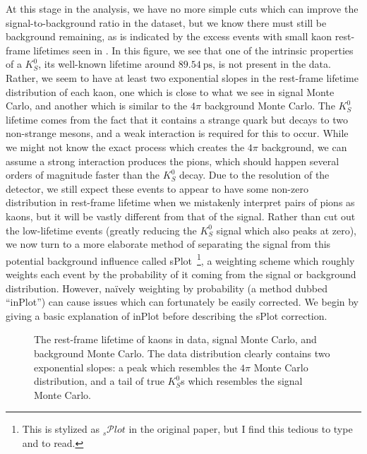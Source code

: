 At this stage in the analysis, we have no more simple cuts which can improve the signal-to-background ratio in the dataset, but we know there must still be background remaining, as is indicated by the excess events with small kaon rest-frame lifetimes seen in . In this figure, we see that one of the intrinsic properties of a $K_S^0$, its well-known lifetime around $\SI{89.54}{\pico\second}$, is not present in the data. Rather, we seem to have at least two exponential slopes in the rest-frame lifetime distribution of each kaon, one which is close to what we see in signal Monte Carlo, and another which is similar to the $4\pi$ background Monte Carlo. The $K_S^0$ lifetime comes from the fact that it contains a strange quark but decays to two non-strange mesons, and a weak interaction is required for this to occur. While we might not know the exact process which creates the $4\pi$ background, we can assume a strong interaction produces the pions, which should happen several orders of magnitude faster than the $K_S^0$ decay. Due to the resolution of the detector, we still expect these events to appear to have some non-zero distribution in rest-frame lifetime when we mistakenly interpret pairs of pions as kaons, but it will be vastly different from that of the signal. Rather than cut out the low-lifetime events (greatly reducing the $K_S^0$ signal which also peaks at zero), we now turn to a more elaborate method of separating the signal from this potential background influence called sPlot~\cite{Pivk2005}\footnote{This is stylized as ${}_s\mathcal{P}lot$ in the original paper, but I find this tedious to type and to read.}, a weighting scheme which roughly weights each event by the probability of it coming from the signal or background distribution. However, na\"ively weighting by probability (a method dubbed ``inPlot'') can cause issues which can fortunately be easily corrected. We begin by giving a basic explanation of inPlot before describing the sPlot correction.

\begin{figure}
  \begin{center}
      
  \end{center}
  \caption{The rest-frame lifetime of kaons in data, signal Monte Carlo, and background Monte Carlo. The data distribution clearly contains two exponential slopes: a peak which resembles the $4\pi$ Monte Carlo distribution, and a tail of true $K_S^0$s which resembles the signal Monte Carlo.}\label{fig:rfl-pre-splot}
\end{figure}

